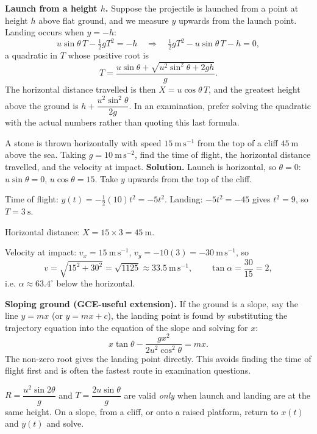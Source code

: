 \documentclass[11pt]{article}
\begin{document}
\textbf{Launch from a height $h$.} Suppose the projectile is launched from a point at height $h$ above flat ground, and we measure $y$ upwards from the launch point. Landing occurs when $y=-h$:
\[
u\sin\theta\,T-\tfrac12 gT^{2}=-h
\quad\Longrightarrow\quad
\tfrac12 gT^{2}-u\sin\theta\,T-h=0,
\]
a quadratic in $T$ whose positive root is
\[
T=\frac{u\sin\theta+\sqrt{u^{2}\sin^{2}\theta+2gh}}{g}.
\]
The horizontal distance travelled is then $X=u\cos\theta\,T$, and the greatest height above the ground is $h+\dfrac{u^{2}\sin^{2}\theta}{2g}$. In an examination, prefer solving the quadratic with the actual numbers rather than quoting this last formula.

\begin{exoresolu}
A stone is thrown horizontally with speed $15\ \mathrm{m\,s^{-1}}$ from the top of a cliff $45\ \mathrm{m}$ above the sea. Taking $g=10\ \mathrm{m\,s^{-2}}$, find the time of flight, the horizontal distance travelled, and the velocity at impact.
\tcblower
\textbf{Solution.} Launch is horizontal, so $\theta=0$: $u\sin\theta=0$, $u\cos\theta=15$. Take $y$ upwards from the top of the cliff.

Time of flight: $y(t)=-\tfrac12(10)t^{2}=-5t^{2}$. Landing: $-5t^{2}=-45$ gives $t^{2}=9$, so $T=3\ \mathrm{s}$.

Horizontal distance: $X=15\times 3=45\ \mathrm{m}$.

Velocity at impact: $v_x=15\ \mathrm{m\,s^{-1}}$, $v_y=-10(3)=-30\ \mathrm{m\,s^{-1}}$, so
\[
v=\sqrt{15^{2}+30^{2}}=\sqrt{1125}\approx 33.5\ \mathrm{m\,s^{-1}},\qquad
\tan\alpha=\frac{30}{15}=2,
\]
i.e. $\alpha\approx 63.4^{\circ}$ below the horizontal.
\end{exoresolu}

\textbf{Sloping ground (GCE-useful extension).} If the ground is a slope, say the line $y=mx$ (or $y=mx+c$), the landing point is found by substituting the trajectory equation into the equation of the slope and solving for $x$:
\[
x\tan\theta-\frac{gx^{2}}{2u^{2}\cos^{2}\theta}=mx.
\]
The non-zero root gives the landing point directly. This avoids finding the time of flight first and is often the fastest route in examination questions.

\begin{attention}
$R=\dfrac{u^{2}\sin 2\theta}{g}$ and $T=\dfrac{2u\sin\theta}{g}$ are valid \emph{only} when launch and landing are at the same height. On a slope, from a cliff, or onto a raised platform, return to $x(t)$ and $y(t)$ and solve.
\end{attention}
\end{document}
